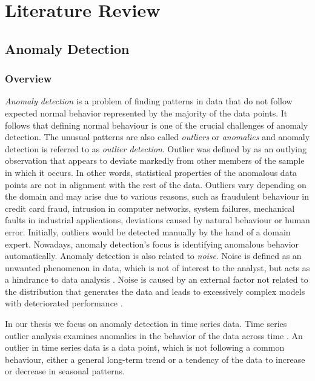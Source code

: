 \chapter{Literature Review}

\section{Anomaly Detection}
\label{section:anomalyDetectionLiteratureReview}
\subsection{Overview}

\textit{Anomaly detection} is a problem of finding patterns in data that do not follow expected normal behavior represented by the majority of the data points. It follows that defining normal behaviour is one of the crucial challenges of anomaly detection. The unusual patterns are also called \textit{outliers} or \textit{anomalies} and anomaly detection is referred to as \textit{outlier detection}. Outlier was defined by \cite{ORD1996175} as an outlying observation that appears to deviate markedly from other members of the sample in which it occurs. In other words, statistical properties of the anomalous data points are not in alignment with the rest of the data. Outliers vary depending on the domain and may arise due to various reasons, such as fraudulent behaviour in credit card fraud, intrusion in computer networks, system failures, mechanical faults in industrial applications, deviations caused by natural behaviour or human error. Initially, outliers would be detected manually by the hand of a domain expert. Nowadays, anomaly detection's focus is identifying anomalous behavior automatically. Anomaly detection is also related to \textit{noise}. Noise is defined as an unwanted phenomenon in data, which is not of interest to the analyst, but acts as a hindrance to data analysis \cite{cvbakv2009}. Noise is  caused by an external factor not related to the distribution that generates the data \cite{ggh2017} and leads to excessively complex models with deteriorated performance \cite{wu2007}. 

In our thesis we focus on anomaly detection in time series data. Time series outlier analysis examines anomalies in the behavior of the data across time \cite{gupta2014}. An outlier in time series data is a data point, which is not following a common behaviour, either a general long-term trend or a tendency of the data to increase or decrease in seasonal patterns. 

